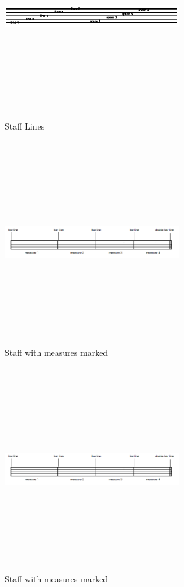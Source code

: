 \documentclass[journal]{IEEEtran}
\begin{document}
\begin{figure}
\includegraphics[width=3in,height=3.5in,clip,keepaspectratio]{resources/images/staff_line}
\centering
\caption{Staff Lines}
\end{figure}

\begin{figure}
\includegraphics[width=3in,height=3.5in,clip,keepaspectratio]{resources/images/measure_lines}
\centering
\caption{Staff with measures marked}
\end{figure}

\begin{figure}
\includegraphics[width=3in,height=3.5in,clip,keepaspectratio]{resources/images/measure_lines}
\centering
\caption{Staff with measures marked}
\end{figure}
\end{document}

